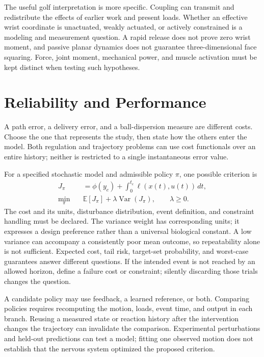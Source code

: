 The useful golf interpretation is more specific. Coupling can transmit and
redistribute the effects of earlier work and present loads. Whether an effective
wrist coordinate is unactuated, weakly actuated, or actively constrained is a
modeling and measurement question. A rapid release does not prove zero wrist
moment, and passive planar dynamics does not guarantee three-dimensional face
squaring. Force, joint moment, mechanical power, and muscle activation must be
kept distinct when testing such hypotheses.

\section{Reliability and Performance}

A path error, a delivery error, and a ball-dispersion measure are different
costs. Choose the one that represents the study, then state how the others
enter the model. Both regulation and trajectory problems can use cost
functionals over an entire history; neither is restricted to a single
instantaneous error value.

For a specified stochastic model and admissible policy $\pi$, one possible
criterion is
\begin{equation}
 \begin{aligned}
 J_\pi&=\phi(y_e)+\int_0^{t_e}\ell(x(t),u(t))\,dt,\\
 \min_\pi\quad&\mathbb E[J_\pi]+\lambda\operatorname{Var}(J_\pi),
 \qquad\lambda\geq0.
 \end{aligned}
 \label{eq:motion_risk_objective}
\end{equation}
The cost and its units, disturbance distribution, event definition, and
constraint handling must be declared. The variance weight has corresponding
units; it expresses a design preference rather than a universal biological
constant. A low variance can accompany a consistently poor mean outcome, so
repeatability alone is not sufficient. Expected cost, tail risk, target-set
probability, and worst-case guarantees answer different questions.
If the intended event is not reached by an allowed horizon, define a failure
cost or constraint; silently discarding those trials changes the question.

A candidate policy may use feedback, a learned reference, or both. Comparing
policies requires recomputing the motion, loads, event time, and output in each
branch. Reusing a measured state or reaction history after the intervention
changes the trajectory can invalidate the comparison. Experimental perturbations
and held-out predictions can test a model; fitting one observed motion does not
establish that the nervous system optimized the proposed criterion.

